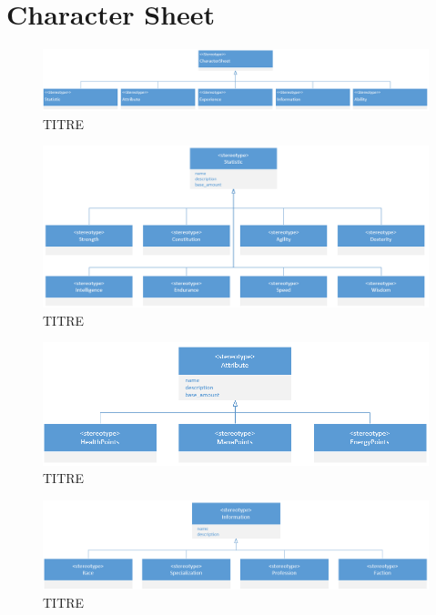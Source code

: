 \section*{Character Sheet}
\begin{figure}[H]
    \centering
    \includegraphics[width=14cm]{10_img/chap5/03_00_charactersheet.PNG} 
    \caption{TITRE}
\end{figure}
\begin{figure}[H]
    \centering
    \includegraphics[width=14cm]{10_img/chap5/03_00_01_statistic.PNG} 
    \caption{TITRE}
\end{figure}
\begin{figure}[H]
    \centering
    \includegraphics[width=14cm]{10_img/chap5/03_00_02_attribute.PNG} 
    \caption{TITRE}
\end{figure}
\begin{figure}[H]
    \centering
    \includegraphics[width=14cm]{10_img/chap5/03_00_03_information.PNG} 
    \caption{TITRE}
\end{figure}


